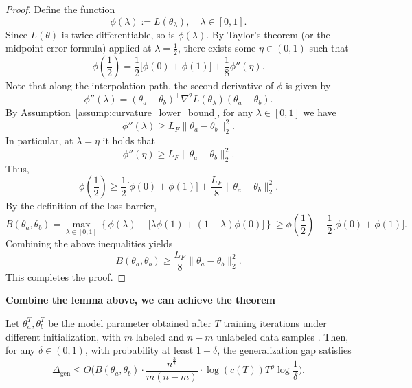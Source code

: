 \begin{proof}
Define the function
\[
\phi(\lambda) := L(\theta_\lambda), \quad \lambda \in [0,1].
\]
Since \( L(\theta) \) is twice differentiable, so is \( \phi(\lambda) \). By Taylor's theorem (or the midpoint error formula) applied at \( \lambda = \frac{1}{2} \), there exists some \( \eta \in (0,1) \) such that
\[
\phi\left(\frac{1}{2}\right) = \frac{1}{2}\Big[\phi(0)+\phi(1)\Big] + \frac{1}{8}\phi''(\eta).
\]
Note that along the interpolation path, the second derivative of \( \phi \) is given by
\[
\phi''(\lambda) = (\theta_a-\theta_b)^\top \nabla^2 L(\theta_\lambda)(\theta_a-\theta_b).
\]
By Assumption~\ref{assump:curvature_lower_bound}, for any \( \lambda \in [0,1] \) we have
\[
\phi''(\lambda) \ge L_F \|\theta_a-\theta_b\|_2^2.
\]
In particular, at \( \lambda = \eta \) it holds that
\[
\phi''(\eta) \ge L_F \|\theta_a-\theta_b\|_2^2.
\]
Thus,
\[
\phi\left(\frac{1}{2}\right) \ge \frac{1}{2}\Big[\phi(0)+\phi(1)\Big] + \frac{L_F}{8}\|\theta_a-\theta_b\|_2^2.
\]
By the definition of the loss barrier,
\[
B(\theta_a,\theta_b) = \max_{\lambda \in [0,1]} \left\{ \phi(\lambda) - \Big[\lambda \phi(1) + (1-\lambda)\phi(0)\Big] \right\} \ge \phi\left(\frac{1}{2}\right) - \frac{1}{2}\Big[\phi(0)+\phi(1)\Big].
\]
Combining the above inequalities yields
\[
B(\theta_a,\theta_b) \ge \frac{L_F}{8}\|\theta_a-\theta_b\|_2^2.
\]
This completes the proof.
\end{proof}
\noindent\textbf{Combine the lemma above, we can achieve the theorem}
\begin{theorem}  
\label{thm:generalization-barrier}  
 Let \(\theta^T_a,\theta^T_b\) be the model parameter obtained after \(T\) training iterations under different initialization, with \(m\) labeled and \(n-m\) unlabeled data samples . Then, for any \(\delta \in (0,1)\), with probability at least \(1 - \delta\), the generalization gap satisfies  
\begin{equation}
\Delta_{\text{gen}} \leq O \bigg(  B(\theta_a, \theta_b)\cdot \frac{n^{\frac{3}{2}}}{m(n-m)} \cdot \log(c(T)) T^\rho \log \frac{1}{\delta} \bigg).
\end{equation}
\end{theorem}
